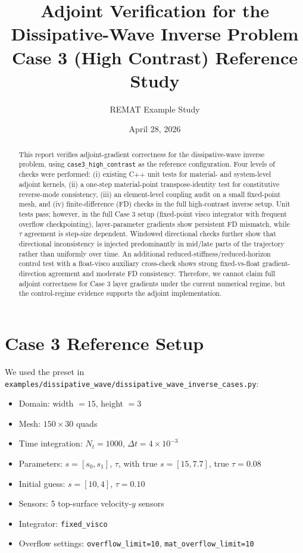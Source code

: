 \documentclass[11pt]{article}
\title{Adjoint Verification for the Dissipative-Wave Inverse Problem\\
Case 3 (High Contrast) Reference Study}
\author{REMAT Example Study}
\date{April 28, 2026}
\begin{document}
\maketitle

\begin{abstract}
This report verifies adjoint-gradient correctness for the dissipative-wave inverse problem, using \texttt{case3\_high\_contrast} as the reference configuration.
Four levels of checks were performed: (i) existing C++ unit tests for material- and system-level adjoint kernels, (ii) a one-step material-point transpose-identity test for constitutive reverse-mode consistency, (iii) an element-level coupling audit on a small fixed-point mesh, and (iv) finite-difference (FD) checks in the full high-contrast inverse setup.
Unit tests pass; however, in the full Case 3 setup (fixed-point visco integrator with frequent overflow checkpointing), layer-parameter gradients show persistent FD mismatch, while $\tau$ agreement is step-size dependent.
Windowed directional checks further show that directional inconsistency is injected predominantly in mid/late parts of the trajectory rather than uniformly over time.
An additional reduced-stiffness/reduced-horizon control test with a float-visco auxiliary cross-check shows strong fixed-vs-float gradient-direction agreement and moderate FD consistency.
Therefore, we cannot claim full adjoint correctness for Case 3 layer gradients under the current numerical regime, but the control-regime evidence supports the adjoint implementation.
\end{abstract}

\section{Case 3 Reference Setup}
We used the preset in \texttt{examples/dissipative\_wave/dissipative\_wave\_inverse\_cases.py}:
\begin{itemize}
\item Domain: width \(=15\), height \(=3\)
\item Mesh: \(150\times 30\) quads
\item Time integration: \(N_t=1000\), \(\Delta t=4\times 10^{-3}\)
\item Parameters: \(s=[s_0,s_1]\), \(\tau\), with true \(s=[15,7.7]\), true \(\tau=0.08\)
\item Initial guess: \(s=[10,4]\), \(\tau=0.10\)
\item Sensors: 5 top-surface velocity-\(y\) sensors
\item Integrator: \texttt{fixed\_visco}
\item Overflow settings: \texttt{overflow\_limit=10}, \texttt{mat\_overflow\_limit=10}
\end{itemize}
\end{document}
